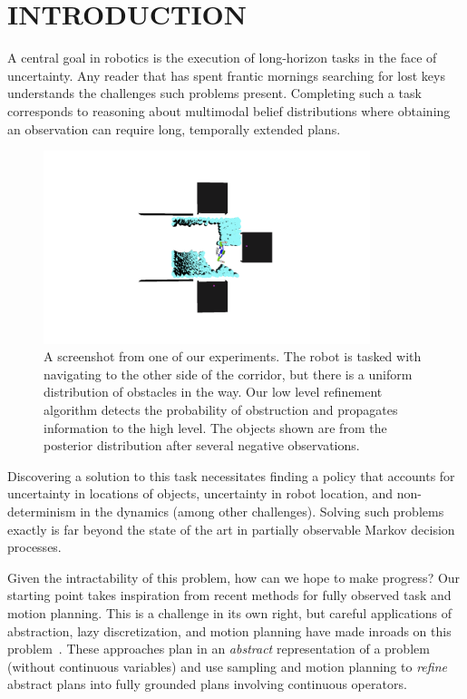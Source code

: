 \section{INTRODUCTION}
A central goal in robotics is the execution of long-horizon tasks in
the face of uncertainty. Any reader that has spent frantic mornings
searching for lost keys understands the challenges such problems
present. Completing such a task corresponds to reasoning about
multimodal belief distributions where obtaining an observation
can require long, temporally extended plans. 
\begin{figure}[h]
  \centering
    \noindent
    \includegraphics[trim = 160mm 90mm 0mm 90mm, clip, width=0.85\textwidth]{corridor_images/corridor_path_2.png}
  \caption{A screenshot from one of our experiments. The robot is
    tasked with navigating to the other side of the corridor, but
    there is a uniform distribution of obstacles in the way. Our low
    level refinement algorithm detects the probability of obstruction and
    propagates information to the high level. The objects shown are
    from the posterior distribution after several negative
    observations.}
  \label{fig:knot_steps}
\end{figure}


Discovering a solution to this task necessitates finding a policy that
accounts for uncertainty in locations of objects, uncertainty in robot location,
and non-determinism in the dynamics (among other
challenges). Solving such problems exactly is far beyond the state of
the art in partially observable Markov decision processes.

Given the intractability of this problem, how can we hope to make
progress? Our starting point takes inspiration from recent methods for
fully observed task and motion planning.  This is a challenge in its
own right, but careful applications of abstraction, lazy
discretization, and motion planning have made inroads on this
problem~\cite{srivastava2014combined, lozano2014constraint}. These
approaches plan in an \emph{abstract} representation of a problem
(without continuous variables) and use sampling and motion planning to
\emph{refine} abstract plans into fully grounded plans involving continuous
operators.

